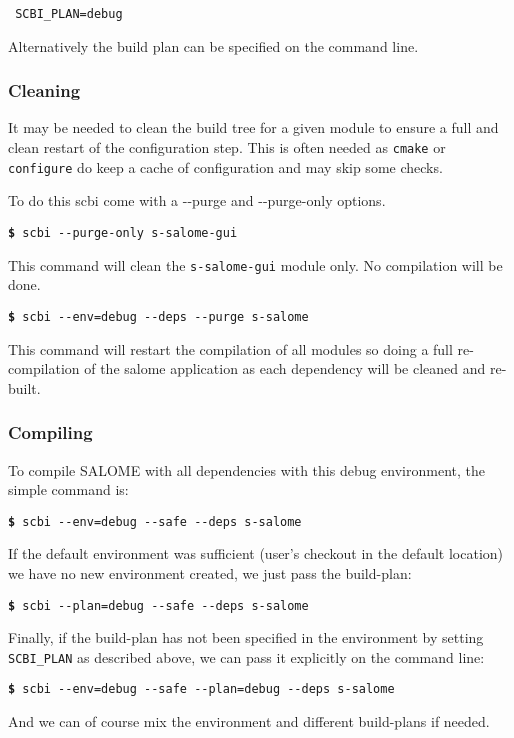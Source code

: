 \documentclass[a4paper,12pt,twoside]{article}
\newcommand{\code}[1]{\texttt{#1}}
\newcommand{\cmd}[1]{\tabto{1cm}\hspace{0.5cm}\texttt{\textbf{\$} #1}}
\newcommand{\ddash}{-{}-}
\begin{document}
\begin{lstlisting}
 SCBI_PLAN=debug
\end{lstlisting}

Alternatively the build plan can be specified on the command line.

\subsubsection{Cleaning}

It may be needed to clean the build tree for a given module to ensure a full and clean restart of the configuration step. This is often needed as \code{cmake} or \code{configure} do keep a cache of configuration and may skip some checks.

To do this scbi come with a \ddash{}purge and \ddash{}purge-only options.

\cmd{scbi \ddash{}purge-only s-salome-gui}

This command will clean the \code{s-salome-gui} module only. No compilation will be done.

\cmd{scbi \ddash{}env=debug \ddash{}deps \ddash{}purge s-salome}

This command will restart the compilation of all modules so doing a full re-compilation of the salome application as each dependency will be cleaned and re-built.

\subsubsection{Compiling}

To compile SALOME with all dependencies with this debug environment, the simple command is:

\cmd{scbi \ddash{}env=debug \ddash{}safe \ddash{}deps s-salome}

If the default environment was sufficient (user's checkout in the default location) we have no new environment created, we just pass the build-plan:

\cmd{scbi \ddash{}plan=debug \ddash{}safe \ddash{}deps s-salome}

Finally, if the build-plan has not been specified in the environment by setting \code{SCBI\_PLAN} as described above, we can pass it explicitly on the command line:

\cmd{scbi \ddash{}env=debug \ddash{}safe \ddash{}plan=debug \ddash{}deps s-salome}

And we can of course mix the environment and different build-plans if needed.
\end{document}
